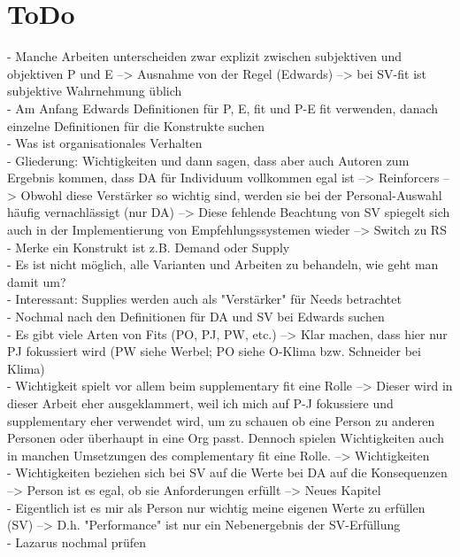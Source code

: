 \section{ToDo}
\label{ch:todo}
- Manche Arbeiten unterscheiden zwar explizit zwischen subjektiven und objektiven P und E --> Ausnahme von der Regel (Edwards) --> bei SV-fit ist subjektive Wahrnehmung üblich \\
- Am Anfang Edwards Definitionen für P, E, fit und P-E fit verwenden, danach einzelne Definitionen für die Konstrukte suchen \\
- Was ist organisationales Verhalten \\
- Gliederung: Wichtigkeiten und dann sagen, dass aber auch Autoren zum Ergebnis kommen, dass DA für Individuum vollkommen egal ist --> Reinforcers --> Obwohl diese Verstärker so wichtig sind, werden sie bei der Personal-Auswahl häufig vernachlässigt (nur DA) --> Diese fehlende Beachtung von SV spiegelt sich auch in der Implementierung von Empfehlungssystemen wieder --> Switch zu RS \\
- Merke ein Konstrukt ist z.B. Demand oder Supply \\
- Es ist nicht möglich, alle Varianten und Arbeiten zu behandeln, wie geht man damit um? \\
- Interessant: Supplies werden auch als "Verstärker" für Needs betrachtet \\
- Nochmal nach den Definitionen für DA und SV bei Edwards suchen \\
- Es gibt viele Arten von Fits (PO, PJ, PW, etc.) --> Klar machen, dass hier nur PJ fokussiert wird (PW siehe Werbel; PO siehe O-Klima bzw. Schneider bei Klima) \\
- Wichtigkeit spielt vor allem beim supplementary fit eine Rolle --> Dieser wird in dieser Arbeit eher ausgeklammert, weil ich mich auf P-J fokussiere und supplementary eher verwendet wird, um zu schauen ob eine Person zu anderen Personen oder überhaupt in eine Org passt. Dennoch spielen Wichtigkeiten auch in manchen Umsetzungen des complementary fit eine Rolle. --> Wichtigkeiten \\
- Wichtigkeiten beziehen sich bei SV auf die Werte bei DA auf die Konsequenzen --> Person ist es egal, ob sie Anforderungen erfüllt --> Neues Kapitel \\
- Eigentlich ist es mir als Person nur wichtig meine eigenen Werte zu erfüllen (SV) --> D.h. "Performance" ist nur ein Nebenergebnis der SV-Erfüllung \\
- Lazarus nochmal prüfen \\

